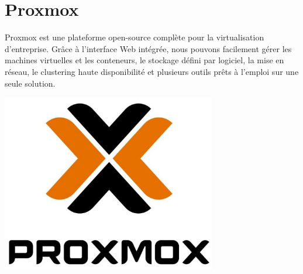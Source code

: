 \documentclass[12pt]{article}
\begin{document}
\section{Proxmox}
\noindent%
\begin{minipage}{.7\textwidth}%
\gls{Proxmox} est une plateforme open-source complète pour la virtualisation d'entreprise. 
Grâce à l'interface Web intégrée, nous pouvons facilement gérer les machines virtuelles et les conteneurs, le stockage défini par logiciel, la mise en réseau, le clustering haute disponibilité et plusieurs outils prêts à l'emploi sur une seule solution. \\

\end{minipage}%
\hfill
\begin{minipage}{.3\textwidth}%
\begin{center}
\includegraphics[width=0.7\textwidth]{src/logo_proxmox.JPG}
\end{center}
\end{minipage}%
\end{document}
